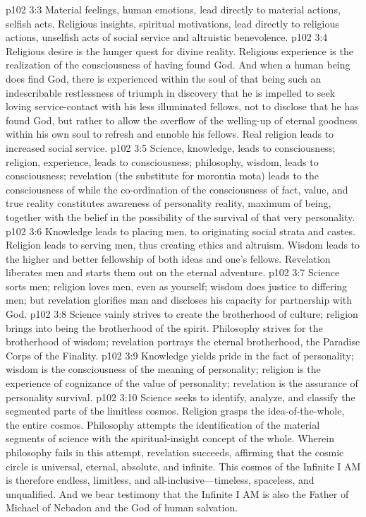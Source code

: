 \vs p102 3:3 Material feelings, human emotions, lead directly to material actions, selfish acts. Religious insights, spiritual motivations, lead directly to religious actions, unselfish acts of social service and altruistic benevolence.
\vs p102 3:4 Religious desire is the hunger quest for divine reality. Religious experience is the realization of the consciousness of having found God. And when a human being does find God, there is experienced within the soul of that being such an indescribable restlessness of triumph in discovery that he is impelled to seek loving service\hyp{}contact with his less illuminated fellows, not to disclose that he has found God, but rather to allow the overflow of the welling\hyp{}up of eternal goodness within his own soul to refresh and ennoble his fellows. Real religion leads to increased social service.
\pc \vs p102 3:5 Science, knowledge, leads to  consciousness; religion, experience, leads to  consciousness; philosophy, wisdom, leads to  consciousness; revelation (the substitute for morontia mota) leads to the consciousness of  while the co\hyp{}ordination of the consciousness of fact, value, and true reality constitutes awareness of personality reality, maximum of being, together with the belief in the possibility of the survival of that very personality.
\pc \vs p102 3:6 Knowledge leads to placing men, to originating social strata and castes. Religion leads to serving men, thus creating ethics and altruism. Wisdom leads to the higher and better fellowship of both ideas and one’s fellows. Revelation liberates men and starts them out on the eternal adventure.
\vs p102 3:7 Science sorts men; religion loves men, even as yourself; wisdom does justice to differing men; but revelation glorifies man and discloses his capacity for partnership with God.
\vs p102 3:8 Science vainly strives to create the brotherhood of culture; religion brings into being the brotherhood of the spirit. Philosophy strives for the brotherhood of wisdom; revelation portrays the eternal brotherhood, the Paradise Corps of the Finality.
\vs p102 3:9 Knowledge yields pride in the fact of personality; wisdom is the consciousness of the meaning of personality; religion is the experience of cognizance of the value of personality; revelation is the assurance of personality survival.
\pc \vs p102 3:10 Science seeks to identify, analyze, and classify the segmented parts of the limitless cosmos. Religion grasps the idea\hyp{}of\hyp{}the\hyp{}whole, the entire cosmos. Philosophy attempts the identification of the material segments of science with the spiritual\hyp{}insight concept of the whole. Wherein philosophy fails in this attempt, revelation succeeds, affirming that the cosmic circle is universal, eternal, absolute, and infinite. This cosmos of the Infinite I AM is therefore endless, limitless, and all\hyp{}inclusive---timeless, spaceless, and unqualified. And we bear testimony that the Infinite I AM is also the Father of Michael of Nebadon and the God of human salvation.
